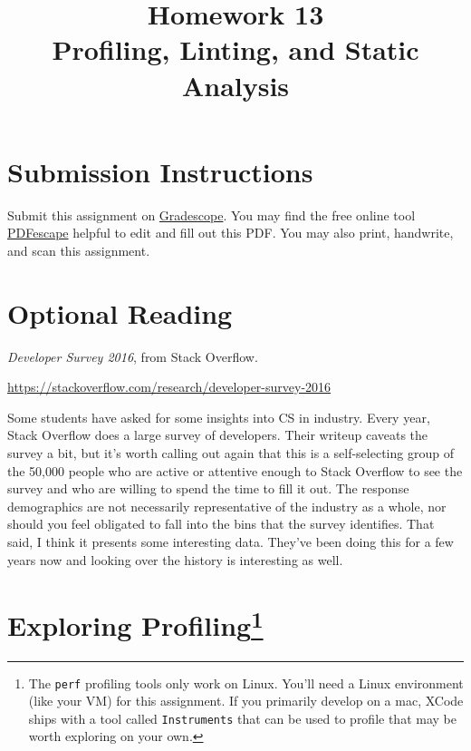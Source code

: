 \documentclass{article}
\begin{document}
\fancyhead[L]{}
\fancyhead[R]{}

\fancyfoot[C]{\color{gray} \thepage~/~\pageref*{LastPage}}
\pagestyle{fancyplain}



\title{\textbf{Homework 13\\Profiling, Linting, and Static Analysis}}
\author{\textbf{\color{red}{Due: Saturday, December 10, 10:00PM (Hard Deadline)}}}
\date{}
\maketitle


\section*{Submission Instructions}
Submit this assignment on \href{https://gradescope.com/courses/3499}{Gradescope}.
You may find the free online tool \href{https://www.pdfescape.com}{PDFescape}
helpful to edit and fill out this PDF.
You may also print, handwrite, and scan this assignment.

\section*{Optional Reading}

\emph{Developer Survey 2016}, from Stack Overflow.

\url{https://stackoverflow.com/research/developer-survey-2016}

Some students have asked for some insights into CS in industry. Every year,
Stack Overflow does a large survey of developers. Their writeup caveats the
survey a bit, but it's worth calling out again that this is a self-selecting
group of the 50,000 people who are active or attentive enough to Stack
Overflow to see the survey and who are willing to spend the time to fill it
out. The response demographics are not necessarily representative of the
industry as a whole, nor should you feel obligated to fall into the bins that
the survey identifies. That said, I think it presents some interesting data.
They've been doing this for a few years now and looking over the history is
interesting as well.


\newpage


\section{Exploring Profiling\protect\footnote{%
  The \texttt{perf} profiling tools only work on Linux. You'll need a Linux
  environment (like your VM) for this assignment. If you primarily develop on
  a mac, XCode ships with a tool called \texttt{Instruments} that can be used
  to profile that may be worth exploring on your own.
}}
\end{document}
